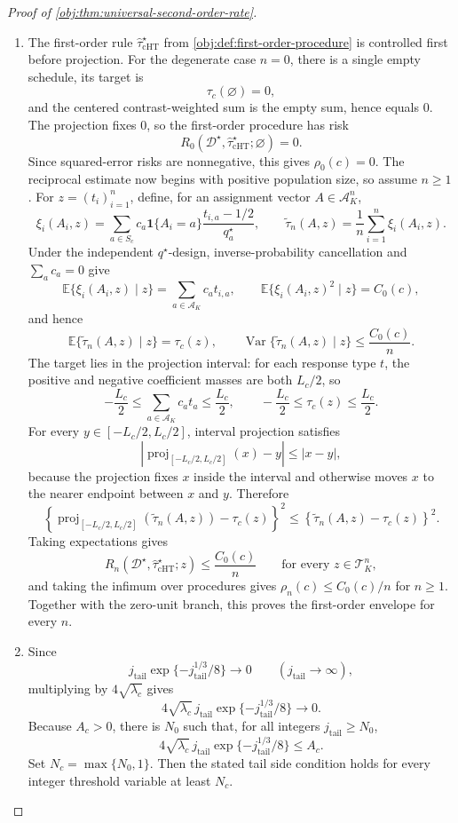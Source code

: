 \documentclass[11pt]{article}
\begin{document}
\begin{proof}[Proof of \cref{obj:thm:universal-second-order-rate}]
\begin{enumerate}
\item The first-order rule \(\widehat\tau_{\mathrm{cHT}}^\star\) from \cref{obj:def:first-order-procedure} is controlled first before projection. For the degenerate case \(n=0\), there is a single empty schedule, its target is
\[
\tau_c(\varnothing)=0,
\]
and the centered contrast-weighted sum is the empty sum, hence equals \(0\). The projection fixes \(0\), so the first-order procedure has risk
\[
R_0(\mathcal D^\star,\widehat\tau_{\mathrm{cHT}}^\star;\varnothing)=0.
\]
Since squared-error risks are nonnegative, this gives \(\rho_0(c)=0\). The reciprocal estimate now begins with positive population size, so assume \(n\ge 1\). For \(z=(t_i)_{i=1}^n\), define, for an assignment vector \(A\in\mathcal A_K^n\),
\[
\xi_i(A_i,z)
=
\sum_{a\in S_c}
 c_a\mathbf 1\{A_i=a\}\frac{t_{i,a}-1/2}{q_a^\star},
\qquad
\widetilde\tau_n(A,z)=\frac1n\sum_{i=1}^n\xi_i(A_i,z).
\]
Under the independent \(q^\star\)-design, inverse-probability cancellation and \(\sum_a c_a=0\) give
\[
\mathbb E\{\xi_i(A_i,z)\mid z\}
=
\sum_{a\in\mathcal A_K} c_a t_{i,a},
\qquad
\mathbb E\{\xi_i(A_i,z)^2\mid z\}=C_0(c),
\]
and hence
\[
\mathbb E\{\widetilde\tau_n(A,z)\mid z\}=\tau_c(z),
\qquad
\operatorname{Var}\{\widetilde\tau_n(A,z)\mid z\}\le \frac{C_0(c)}{n}.
\]
The target lies in the projection interval: for each response type \(t\), the positive and negative coefficient masses are both \(L_c/2\), so
\[
-\frac{L_c}{2}
\le
\sum_{a\in\mathcal A_K}c_a t_a
\le
\frac{L_c}{2},
\qquad
-\frac{L_c}{2}\le \tau_c(z)\le \frac{L_c}{2}.
\]
For every \(y\in[-L_c/2,L_c/2]\), interval projection satisfies
\[
\left|\operatorname{proj}_{[-L_c/2,L_c/2]}(x)-y\right|\le |x-y|,
\]
because the projection fixes \(x\) inside the interval and otherwise moves \(x\) to the nearer endpoint between \(x\) and \(y\). Therefore
\[
\left\{\operatorname{proj}_{[-L_c/2,L_c/2]}(\widetilde\tau_n(A,z))-\tau_c(z)\right\}^2
\le
\left\{\widetilde\tau_n(A,z)-\tau_c(z)\right\}^2.
\]
Taking expectations gives
\[
R_n(\mathcal D^\star,\widehat\tau_{\mathrm{cHT}}^\star;z)\le \frac{C_0(c)}{n}
\qquad\text{for every }z\in\mathcal T_K^n,
\]
and taking the infimum over procedures gives \(\rho_n(c)\le C_0(c)/n\) for \(n\ge1\). Together with the zero-unit branch, this proves the first-order envelope for every \(n\).

\item Since
\[
j_{\mathrm{tail}}\exp\{-j_{\mathrm{tail}}^{1/3}/8\}\longrightarrow 0
\qquad(j_{\mathrm{tail}}\to\infty),
\]
multiplying by \(4\sqrt{\lambda_c}\) gives
\[
4\sqrt{\lambda_c}\,j_{\mathrm{tail}}\exp\{-j_{\mathrm{tail}}^{1/3}/8\}\longrightarrow 0 .
\]
Because \(A_c>0\), there is \(N_0\) such that, for all integers \(j_{\mathrm{tail}}\ge N_0\),
\[
4\sqrt{\lambda_c}\,j_{\mathrm{tail}}\exp\{-j_{\mathrm{tail}}^{1/3}/8\}\le A_c .
\]
Set \(N_c=\max\{N_0,1\}\). Then the stated tail side condition holds for every integer threshold variable at least \(N_c\).


\end{enumerate}
\end{proof}
\end{document}
